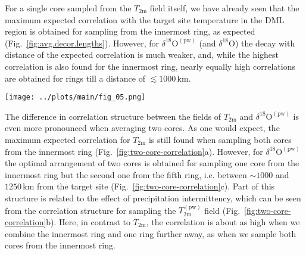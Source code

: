 \documentclass[cp, manuscript]{copernicus}
\begin{document}
For a single core sampled from the $T_{\mathrm{2m}}$ field itself, we have
already seen that the maximum expected correlation with the target site
temperature in the DML region is obtained for sampling from the innermost ring,
as expected (Fig.~\ref{fig:avg.decor.lengths}). However, for
$\delta^{18}\mathrm{O}^{\mathrm{(pw)}}$ (and $\delta^{18}\mathrm{O}$) the decay
with distance of the expected correlation is much weaker, and, while the highest
correlation is also found for the innermost ring, nearly equally high
correlations are obtained for rings till a distance of $\lesssim1000$\,km.

\begin{figure*}[t]%
\centering
\texttt{[image: ../plots/main/fig\_05.png]}
\caption{%
  The expected correlation with the target site temperature for the average of
  two cores in the DML region. Shown is the mean correlation of all possible
  single correlations from averaging two grid cells of (\textbf{a})
  $T_{\mathrm{2m}}$, (\textbf{b}) $T_{\mathrm{2m}}^{\mathrm{(pw)}}$ and
  (\textbf{c}) $\delta^{18}\mathrm{O}^{\mathrm{(pw)}}$ time series sampled from
  the same or from two different ring bins, averaged over all target sites in
  the given region. The axes display the distance from the target, where the $x$
  ($y$) axis stands for the first (second) sampled ring bin and tickmarks
  indicate the radius of the midpoints of the ring bins.}
\label{fig:two-core-correlation}%
\end{figure*}%

The difference in correlation structure between the fields of $T_{\mathrm{2m}}$
and $\delta^{18}\mathrm{O}^{\mathrm{(pw)}}$ is even more pronounced when
averaging two cores. As one would expect, the maximum expected correlation for
$T_{\mathrm{2m}}$ is still found when sampling both cores from the innermost
ring (Fig.~\ref{fig:two-core-correlation}a). However, for
$\delta^{18}\mathrm{O}^{\mathrm{(pw)}}$ the optimal arrangement of two cores is
obtained for sampling one core from the innermost ring but the second one from
the fifth ring, i.e. between $\sim1000$ and $1250$\,km from the target site
(Fig.~\ref{fig:two-core-correlation}c). Part of this structure is related to the
effect of precipitation intermittency, which can be seen from the correlation
structure for sampling the $T_{\mathrm{2m}}^{\mathrm{(pw)}}$ field
(Fig.~\ref{fig:two-core-correlation}b). Here, in contrast to $T_{\mathrm{2m}}$,
the correlation is about as high when we combine the innermost ring and one ring
further away, as when we sample both cores from the innermost ring.
\end{document}
